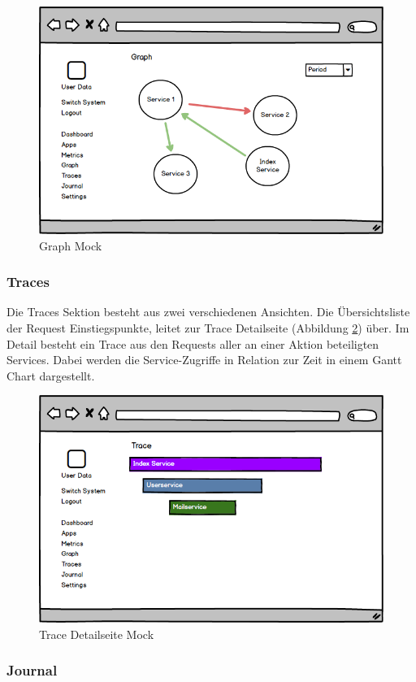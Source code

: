 \begin{figure}[h]
 \centering
 \includegraphics[width=0.6\linewidth]{kapitel1/mocks/graph.png}
 \caption{Graph Mock}
 \label{fig:graph}
\end{figure}

\subsubsection{Traces}

Die Traces Sektion besteht aus zwei verschiedenen Ansichten. Die Übersichtsliste der Request Einstiegspunkte,
leitet zur Trace Detailseite (Abbildung \ref{fig:trace}) über. Im Detail besteht ein Trace aus den Requests
aller an einer Aktion beteiligten Services. Dabei werden die Service-Zugriffe in Relation zur Zeit in einem Gantt Chart dargestellt.

\vspace{0.3cm}
\begin{figure}[h]
 \centering
 \includegraphics[width=0.7\linewidth]{kapitel1/mocks/trace.png}
 \caption{Trace Detailseite Mock}
 \label{fig:trace}
\end{figure}


\subsubsection{Journal}

